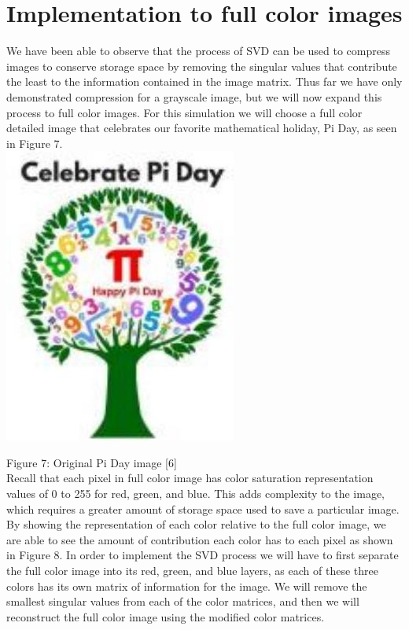 \documentclass[10pt]{article}
\begin{document}
\section*{Implementation to full color images}
We have been able to observe that the process of SVD can be used to compress images to conserve storage space by removing the singular values that contribute the least to the information contained in the image matrix. Thus far we have only demonstrated compression for a grayscale image, but we will now expand this process to full color images. For this simulation we will choose a full color detailed image that celebrates our favorite mathematical holiday, Pi Day, as seen in Figure 7.\\
\includegraphics[max width=\textwidth, center]{2025_04_09_7d70d965b908bc4c1892g-5}

Figure 7: Original Pi Day image [6]\\
Recall that each pixel in full color image has color saturation representation values of 0 to 255 for red, green, and blue. This adds complexity to the image, which requires a greater amount of storage space used to save a particular image. By showing the representation of each color relative to the full color image, we are able to see the amount of contribution each color has to each pixel as shown in Figure 8. In order to implement the SVD process we will have to first separate the full color image into its red, green, and blue layers, as each of these three colors has its own matrix of information for the image. We will remove the smallest singular values from each of the color matrices, and then we will reconstruct the full color image using the modified color matrices.
\end{document}
